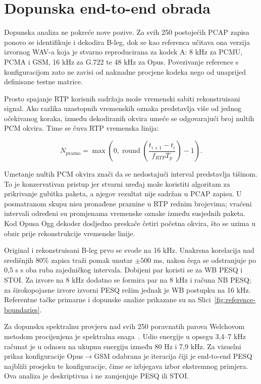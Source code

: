 \section{Dopunska end-to-end obrada}

Dopunska analiza ne pokreće nove pozive. Za svih 250 postojećih PCAP zapisa ponovo se identifikuje i dekodira B-leg, dok se kao referenca učitava ona verzija izvornog WAV-a koja je stvarno reproducirana za kodek A: 8 kHz za PCMU, PCMA i GSM, 16 kHz za G.722 te 48 kHz za Opus. Povezivanje reference s konfiguracijom zato ne zavisi od naknadne procjene kodeka nego od unaprijed definisane testne matrice.

Prosto spajanje RTP korisnih sadržaja može vremenski sabiti rekonstruisani signal. Ako razlika uzastopnih vremenskih oznaka predstavlja više od jednog očekivanog koraka, između dekodiranih okvira umeće se odgovarajući broj nultih PCM okvira. Time se čuva RTP vremenska linija:

\begin{equation}
N_{\mathrm{prazno}}=\max\!\left(0,\operatorname{round}\!\left(\frac{t_{i+1}-t_i}{f_{RTP}T_p}\right)-1\right).
\end{equation}

Umetanje nultih PCM okvira znači da se nedostajući interval predstavlja tišinom. To je konzervativan pristup jer stvarni uređaj može koristiti algoritam za prikrivanje gubitka paketa, a njegov rezultat nije sadržan u PCAP zapisu. U posmatranom skupu nisu pronađene praznine u RTP rednim brojevima; vraćeni intervali određeni su promjenama vremenske oznake između susjednih paketa. Kod Opusa Ogg dekoder dosljedno preskače četiri početna okvira, što se uzima u obzir prije rekonstrukcije vremenske linije.

Original i rekonstruisani B-leg prvo se svode na 16 kHz. Unakrsna korelacija nad središnjih 80\% zapisa traži pomak unutar $\pm500$ ms, nakon čega se odstranjuje po 0,5 s s oba ruba zajedničkog intervala. Dobijeni par koristi se za WB PESQ i STOI. Za izvore na 8 kHz dodatno se formira par na 8 kHz i računa NB PESQ; za širokopojasne izvore izvorni PESQ režim jednak je WB postupku na 16 kHz. Referentne tačke primarne i dopunske analize prikazane su na Slici~\ref{fig:reference-boundaries}.

Za dopunsku spektralnu provjeru nad svih 250 poravnatih parova Welchovom metodom procijenjena je spektralna snaga~\cite{welch1967}. Udio energije u opsegu 3,4--7 kHz računat je u odnosu na ukupnu energiju između 80 Hz i 7,9 kHz. Za vizuelni prikaz konfiguracije Opus$\rightarrow$GSM odabrana je iteracija čiji je end-to-end PESQ najbliži prosjeku te konfiguracije, čime se izbjegava izbor ekstremnog primjera. Ova analiza je deskriptivna i ne zamjenjuje PESQ ili STOI.

